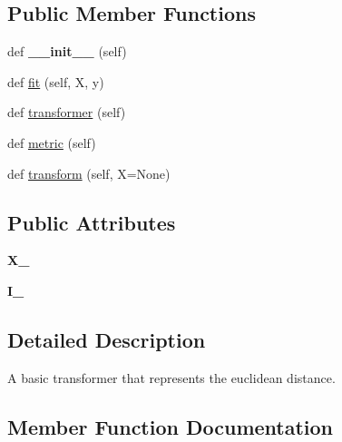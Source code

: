 \subsection*{Public Member Functions}
\begin{DoxyCompactItemize}
\item 
def {\bfseries \+\_\+\+\_\+init\+\_\+\+\_\+} (self)\hypertarget{classdml_1_1base_1_1Euclidean_a2d007bd1fc23843cdfe254ab324430ee}{}\label{classdml_1_1base_1_1Euclidean_a2d007bd1fc23843cdfe254ab324430ee}

\item 
def \hyperlink{classdml_1_1base_1_1Euclidean_abb5019bfc4f36264956a35134bb70ead}{fit} (self, X, y)
\item 
def \hyperlink{classdml_1_1base_1_1Euclidean_aaf850e3fb2714fddaae16930f2a0384c}{transformer} (self)
\item 
def \hyperlink{classdml_1_1base_1_1Euclidean_a476fc37bc38eaa15b3de0dead8e4ba63}{metric} (self)
\item 
def \hyperlink{classdml_1_1base_1_1Euclidean_a5b8e56f02ab4c981cf4bc71fddf7acdb}{transform} (self, X=None)
\end{DoxyCompactItemize}
\subsection*{Public Attributes}
\begin{DoxyCompactItemize}
\item 
{\bfseries X\+\_\+}\hypertarget{classdml_1_1base_1_1Euclidean_a93e7d1dde6c572e5ab42d575d626e030}{}\label{classdml_1_1base_1_1Euclidean_a93e7d1dde6c572e5ab42d575d626e030}

\item 
{\bfseries I\+\_\+}\hypertarget{classdml_1_1base_1_1Euclidean_aeac6e6927daad328db69450880ce04cb}{}\label{classdml_1_1base_1_1Euclidean_aeac6e6927daad328db69450880ce04cb}

\end{DoxyCompactItemize}


\subsection{Detailed Description}
\begin{DoxyVerb}A basic transformer that represents the euclidean distance.
\end{DoxyVerb}
 

\subsection{Member Function Documentation}

